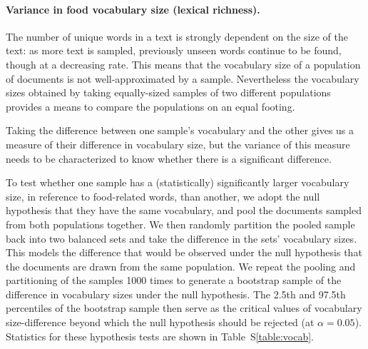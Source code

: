 \documentclass{sigchi}
\begin{document}
\paragraph{Variance in food vocabulary size (lexical richness).}
The number of unique words in a text is strongly dependent on the size
of the text: as more text is sampled, previously unseen words continue
to be found, though at a decreasing rate.  
This means that the vocabulary size of a population of documents is 
not well-approximated by a sample.  Nevertheless the vocabulary sizes
obtained by taking equally-sized samples of two different populations
provides a means to compare the populations on an equal footing.

Taking the difference between one sample's vocabulary and the 
other gives us a measure of their difference in vocabulary size, but 
the variance of this measure needs to be characterized to know whether
there is a significant difference.

To test whether one sample has a (statistically) significantly larger
vocabulary size, in reference to food-related words, than another, we adopt 
the null hypothesis that they
have the same vocabulary, and pool the documents sampled from both 
populations together.  We then randomly partition the pooled sample
back into two balanced sets and take the difference in the sets' 
vocabulary sizes.  This models the difference that would be observed
under the null hypothesis that the documents are drawn from the same
population.  We repeat the pooling and partitioning of the samples
1000 times to generate a bootstrap sample of the difference in 
vocabulary sizes under the null hypothesis.  The 
2.5th and 97.5th percentiles of the bootstrap sample then serve as the
critical values of vocabulary size-difference beyond which the null hypothesis
should be rejected (at $\alpha=0.05$).
Statistics for these hypothesis tests are shown in 
Table~S\ref{table:vocab}.
\end{document}
